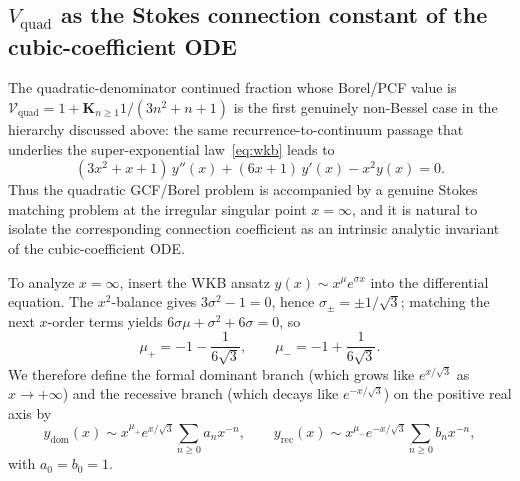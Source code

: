 \subsection{$V_{\mathrm{quad}}$ as the Stokes connection constant of the cubic-coefficient ODE}\label{subsec:vquad-stokes-gcf}

The quadratic-denominator continued fraction whose Borel/PCF value is $\mathcal{V}_{\mathrm{quad}}=1+\mathbf{K}_{n\ge 1}1/(3n^2+n+1)$ is the first genuinely non-Bessel case in the hierarchy discussed above: the same recurrence-to-continuum passage that underlies the super-exponential law~\eqref{eq:wkb} leads to
\[
  (3x^2+x+1)\,y''(x) + (6x+1)\,y'(x) - x^2 y(x) = 0.
\]
Thus the quadratic GCF/Borel problem is accompanied by a genuine Stokes matching problem at the irregular singular point $x=\infty$, and it is natural to isolate the corresponding connection coefficient as an intrinsic analytic invariant of the cubic-coefficient ODE.

To analyze $x=\infty$, insert the WKB ansatz $y(x)\sim x^{\mu}e^{\sigma x}$ into the differential equation. The $x^2$-balance gives $3\sigma^2-1=0$, hence $\sigma_{\pm}=\pm 1/\sqrt{3}$; matching the next $x$-order terms yields $6\sigma\mu+\sigma^2+6\sigma=0$, so
\[
  \mu_{+}=-1-\frac{1}{6\sqrt{3}},
  \qquad
  \mu_{-}=-1+\frac{1}{6\sqrt{3}}.
\]
We therefore define the formal dominant branch (which grows like $e^{x/\sqrt{3}}$ as $x\to+\infty$) and the recessive branch (which decays like $e^{-x/\sqrt{3}}$) on the positive real axis by
\[
  y_{\mathrm{dom}}(x)\sim x^{\mu_+}e^{x/\sqrt{3}}\sum_{n\ge 0} a_n x^{-n},
  \qquad
  y_{\mathrm{rec}}(x)\sim x^{\mu_-}e^{-x/\sqrt{3}}\sum_{n\ge 0} b_n x^{-n},
\]
with $a_0=b_0=1$.


